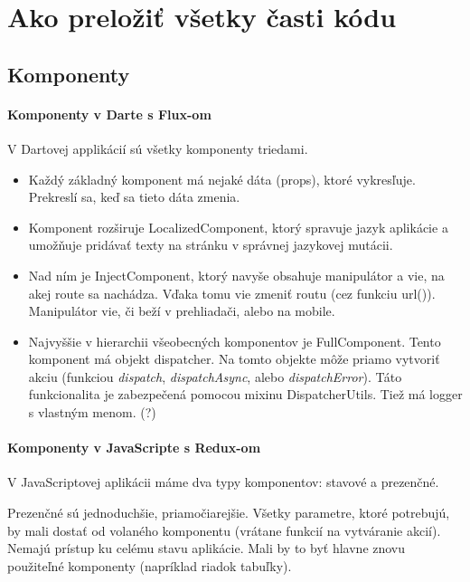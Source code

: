 \section{Ako preložiť všetky časti kódu}
\TODO{}

\subsection{Komponenty}

\paragraph{Komponenty v Darte s Flux-om}
V Dartovej applikácií sú všetky komponenty triedami.

\begin{itemize}
\item Každý základný komponent má nejaké dáta (props), ktoré vykresľuje. Prekreslí sa, keď sa tieto dáta zmenia.

\item Komponent rozširuje LocalizedComponent, ktorý spravuje jazyk aplikácie a umožňuje pridávať texty na stránku v správnej jazykovej mutácii.

\item Nad ním je InjectComponent, ktorý navyše obsahuje manipulátor a vie, na akej route sa nachádza. Vďaka tomu vie zmeniť routu (cez funkciu url()). Manipulátor vie, či beží v prehliadači, alebo na mobile.

\item Najvyššie v hierarchii všeobecných komponentov je FullComponent. Tento komponent má objekt dispatcher. Na tomto objekte môže priamo vytvoriť akciu (funkciou \emph{dispatch}, \emph{dispatchAsync}, alebo \emph{dispatchError}). Táto funkcionalita je zabezpečená pomocou mixinu DispatcherUtils.
Tiež má logger s vlastným menom. (?)
\end{itemize}

\paragraph{Komponenty v JavaScripte s Redux-om}
V JavaScriptovej aplikácii máme dva typy komponentov: stavové a prezenčné. 

Prezenčné sú jednoduchšie, priamočiarejšie. Všetky parametre, ktoré potrebujú, by mali dostať od volaného komponentu (vrátane funkcií na vytváranie akcií). Nemajú prístup ku celému stavu aplikácie. Mali by to byť hlavne znovu použiteľné komponenty (napríklad riadok tabuľky).

